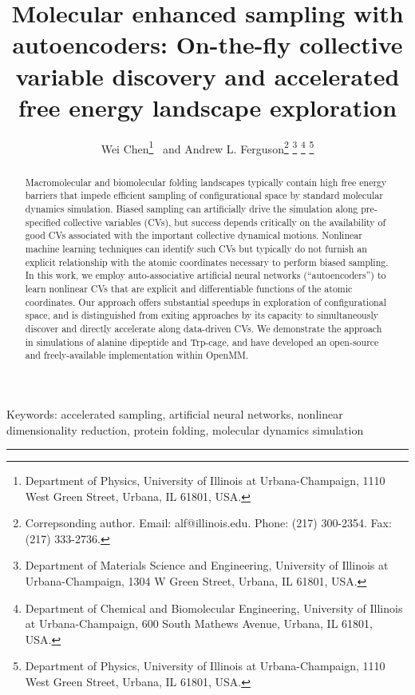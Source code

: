 \documentclass[12pt]{article}
\title{Molecular enhanced sampling with autoencoders: On-the-fly collective variable discovery and accelerated free energy landscape exploration}
\author{Wei Chen\thanks{Department of Physics, University of Illinois at Urbana-Champaign, 1110 West Green Street, Urbana, IL 61801, USA.} \, and Andrew L. Ferguson\thanks{Correpsonding author. Email: alf@illinois.edu. Phone: (217) 300-2354. Fax: (217) 333-2736.} \thanks{Department of Materials Science and Engineering, University of Illinois at Urbana-Champaign, 1304 W Green Street, Urbana, IL 61801, USA.} \thanks{Department of Chemical and Biomolecular Engineering, University of Illinois at Urbana-Champaign, 600 South Mathews Avenue, Urbana, IL 61801, USA.}  \thanks{Department of Physics, University of Illinois at Urbana-Champaign, 1110 West Green Street, Urbana, IL 61801, USA.}}
\newenvironment{wileykeywords}{\textsf{Keywords:}\hspace{\stretch{1}}}{\hspace{\stretch{1}}\rule{1ex}{1ex}}
\newcommand*{\groen}[1]{#1}
\begin{document}
\maketitle


\begin{abstract}
\noindent Macromolecular and biomolecular folding landscapes typically contain high free energy barriers that impede efficient sampling of configurational space by standard molecular dynamics simulation. Biased sampling can artificially drive the simulation along pre-specified collective variables (\groen{CVs}), but success depends critically on the availability of good CVs associated with the important collective dynamical motions. Nonlinear machine learning techniques can identify such CVs but typically do not furnish an explicit relationship with the atomic coordinates necessary to perform biased sampling. In this work, we employ auto-associative artificial neural networks (``autoencoders'') to learn nonlinear CVs that are explicit and differentiable functions of the atomic coordinates. Our approach offers substantial speedups in exploration of configurational space, and is distinguished from exiting approaches by its capacity to simultaneously discover and directly accelerate along data-driven CVs. We demonstrate the approach in simulations of alanine dipeptide and Trp-cage, and have developed an open-source and freely-available implementation within OpenMM.
\end{abstract}

\begin{wileykeywords}
accelerated sampling, artificial neural networks, nonlinear dimensionality reduction, protein folding, molecular dynamics simulation
\end{wileykeywords}

\clearpage



\begin{figure}[h]
\centering
\colorbox{background-color}{
}
\end{figure}
\end{document}
